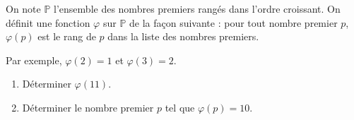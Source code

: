\exo

On note $\mathbb{P}$ l'ensemble des nombres premiers rangés dans l'ordre croissant.
On définit une fonction $\varphi$ sur $\mathbb{P}$ de la façon suivante : pour tout nombre premier $p$, $\varphi(p)$ est le rang de $p$ dans la liste des nombres premiers.

Par exemple, $\varphi(2)=1$ et $\varphi(3)=2$.

\begin{enumerate}
\item Déterminer $\varphi(11)$.
\item Déterminer le nombre premier $p$ tel que $\varphi(p)=10$.
\end{enumerate}
